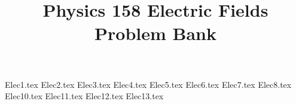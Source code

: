 \documentclass[11pt, fleqn]{article}
\title{Physics 158 Electric Fields Problem Bank}
\author{}
\date{}
\begin{document}
\allowdisplaybreaks
\pgfplotsset{compat=1.18}

\maketitle

{Elec1.tex}
{Elec2.tex}
{Elec3.tex}
{Elec4.tex}
{Elec5.tex}
{Elec6.tex}
{Elec7.tex}
{Elec8.tex}
{Elec10.tex}
{Elec11.tex}
{Elec12.tex}
{Elec13.tex}
\end{document}
